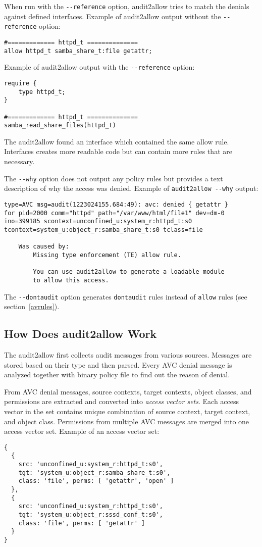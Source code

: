 When run with the \texttt{-{}-reference} option, audit2allow tries to match the
denials against defined interfaces. Example of audit2allow output without the
\texttt{-{}-reference} option:
\begin{lstlisting}
#============= httpd_t ==============
allow httpd_t samba_share_t:file getattr;
\end{lstlisting}
Example of audit2allow output with the \texttt{-{}-reference} option:
\begin{lstlisting}
require {
	type httpd_t;
}

#============= httpd_t ==============
samba_read_share_files(httpd_t)
\end{lstlisting}
The audit2allow found an interface which contained the same allow
rule. Interfaces creates more readable code but can contain more rules that are
necessary.

The \texttt{-{}-why} option does not output any policy rules but provides a text
description of why the access was denied. Example of \texttt{audit2allow
-{}-why} output:
\begin{lstlisting}
type=AVC msg=audit(1223024155.684:49): avc: denied { getattr }
for pid=2000 comm="httpd" path="/var/www/html/file1" dev=dm-0
ino=399185 scontext=unconfined_u:system_r:httpd_t:s0
tcontext=system_u:object_r:samba_share_t:s0 tclass=file

    Was caused by:
        Missing type enforcement (TE) allow rule.

        You can use audit2allow to generate a loadable module
        to allow this access.
\end{lstlisting}

The \texttt{-{}-dontaudit} option generates \texttt{dontaudit} rules instead of
\texttt{allow} rules (see section~\ref{avrules}).

\subsection{How Does audit2allow Work}
The audit2allow first collects audit messages from various sources. Messages are
stored based on their type and then parsed. Every AVC denial message is analyzed
together with binary policy file to find out the reason of denial.

From AVC denial messages, source contexts, target contexts, object classes, and
permissions are extracted and converted into \emph{access vector sets}. Each
access vector in the set contains unique combination of source context, target
context, and object class. Permissions from multiple AVC messages are merged
into one access vector set. Example of an access vector set:
\begin{lstlisting}
{
  {
    src: 'unconfined_u:system_r:httpd_t:s0',
    tgt: 'system_u:object_r:samba_share_t:s0',
    class: 'file', perms: [ 'getattr', 'open' ]
  },
  {
    src: 'unconfined_u:system_r:httpd_t:s0',
    tgt: 'system_u:object_r:sssd_conf_t:s0',
    class: 'file', perms: [ 'getattr' ]
  }
}
\end{lstlisting}

